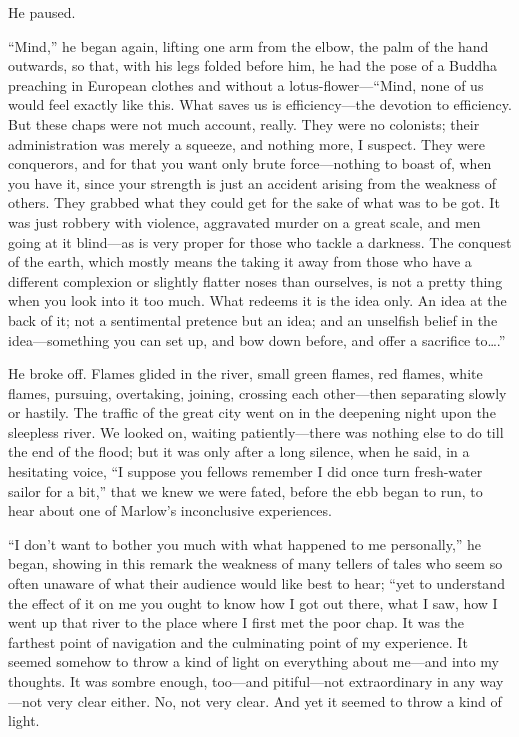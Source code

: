 \documentclass[12pt]{report}
\begin{document}
He paused.

``Mind,'' he began again, lifting one arm from the elbow, the palm of
the hand outwards, so that, with his legs folded before him, he had the
pose of a Buddha preaching in European clothes and without a
lotus-flower---``Mind, none of us would feel exactly like this. What
saves us is efficiency---the devotion to efficiency. But these chaps
were not much account, really. They were no colonists; their
administration was merely a squeeze, and nothing more, I suspect. They
were conquerors, and for that you want only brute force---nothing to
boast of, when you have it, since your strength is just an accident
arising from the weakness of others. They grabbed what they could get
for the sake of what was to be got. It was just robbery with violence,
aggravated murder on a great scale, and men going at it blind---as is
very proper for those who tackle a darkness. The conquest of the earth,
which mostly means the taking it away from those who have a different
complexion or slightly flatter noses than ourselves, is not a pretty
thing when you look into it too much. What redeems it is the idea only.
An idea at the back of it; not a sentimental pretence but an idea; and
an unselfish belief in the idea---something you can set up, and bow down
before, and offer a sacrifice to\ldots{}.''

He broke off. Flames glided in the river, small green flames, red
flames, white flames, pursuing, overtaking, joining, crossing each
other---then separating slowly or hastily. The traffic of the great city
went on in the deepening night upon the sleepless river. We looked on,
waiting patiently---there was nothing else to do till the end of the
flood; but it was only after a long silence, when he said, in a
hesitating voice, ``I suppose you fellows remember I did once turn
fresh-water sailor for a bit,'' that we knew we were fated, before the
ebb began to run, to hear about one of Marlow's inconclusive
experiences.

``I don't want to bother you much with what happened to me personally,''
he began, showing in this remark the weakness of many tellers of tales
who seem so often unaware of what their audience would like best to
hear; ``yet to understand the effect of it on me you ought to know how I
got out there, what I saw, how I went up that river to the place where I
first met the poor chap. It was the farthest point of navigation and the
culminating point of my experience. It seemed somehow to throw a kind of
light on everything about me---and into my thoughts. It was sombre
enough, too---and pitiful---not extraordinary in any way---not very
clear either. No, not very clear. And yet it seemed to throw a kind of
light.
\end{document}
